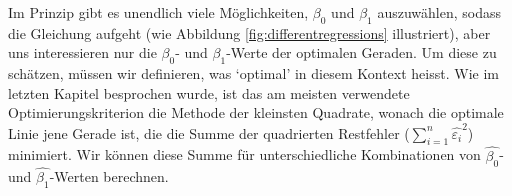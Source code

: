 \documentclass[oneside, 10pt]{book}\usepackage[]{graphicx}\usepackage[]{xcolor}
\makeatletter
\newcommand{\hlnum}[1]{\textcolor[rgb]{0.686,0.059,0.569}{#1}}%
\newcommand{\hlopt}[1]{\textcolor[rgb]{0,0,0}{#1}}%
\newcommand{\hlstd}[1]{\textcolor[rgb]{0.345,0.345,0.345}{#1}}%
\newcommand{\hlkwd}[1]{\textcolor[rgb]{0.737,0.353,0.396}{\textbf{#1}}}%
\newenvironment{kframe}{%
 \def\at@end@of@kframe{}%
 \ifinner\ifhmode%
  \def\at@end@of@kframe{\end{minipage}}%
  \begin{minipage}{\columnwidth}%
 \fi\fi%
 \def\FrameCommand##1{\hskip\@totalleftmargin \hskip-\fboxsep
 \colorbox{shadecolor}{##1}\hskip-\fboxsep
     \hskip-\linewidth \hskip-\@totalleftmargin \hskip\columnwidth}%
 \MakeFramed {\advance\hsize-\width
   \@totalleftmargin\z@ \linewidth\hsize
   \@setminipage}}%
 {\par\unskip\endMakeFramed%
 \at@end@of@kframe}
\newenvironment{knitrout}{}{} %
\makeatother
\begin{document}
Im Prinzip gibt es unendlich viele Möglichkeiten, $\beta_0$ und $\beta_1$ auszuwählen,
sodass die Gleichung aufgeht (wie Abbildung \ref{fig:differentregressions} illustriert),
aber uns interessieren nur die $\beta_0$- und $\beta_1$-Werte der optimalen Geraden.
Um diese zu schätzen, müssen wir definieren, was `optimal' in diesem Kontext heisst.
Wie im letzten Kapitel besprochen wurde, ist das am meisten verwendete Optimierungskriterion die Methode der kleinsten Quadrate, wonach die optimale Linie jene Gerade ist,
die die Summe der quadrierten Restfehler ($\sum_{i = 1}^{n} \widehat{\varepsilon_i}^2$) minimiert.
Wir können diese Summe für unterschiedliche Kombinationen
von $\widehat{\beta_0}$- und $\widehat{\beta_1}$-Werten berechnen.
\end{document}
